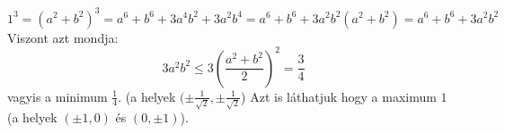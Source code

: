 $$
1^3=(a^{2}+b^{2})^{3}=
a^{6}+b^{6}+3a^{4}b^{2}+3a^{2}b^{4}=
a^{6}+b^{6}+3a^{2}b^{2}(a^{2}+b^{2})=
a^{6}+b^{6}+3a^{2}b^{2}
$$
Viszont  azt mondja:
$$
3a^{2}b^{2} \le 3{\left(\frac{a^{2}+b^{2}}{2}\right)}^2 = \frac{3}{4}
$$
vagyis a minimum $\frac{1}{4}$. (a helyek $(\pm\frac{1}{\sqrt{2}},\pm\frac{1}{\sqrt{2}}$) 
Azt is láthatjuk hogy a maximum $1$ (a helyek $(\pm 1,0)$ és $(0,\pm 1)$).

